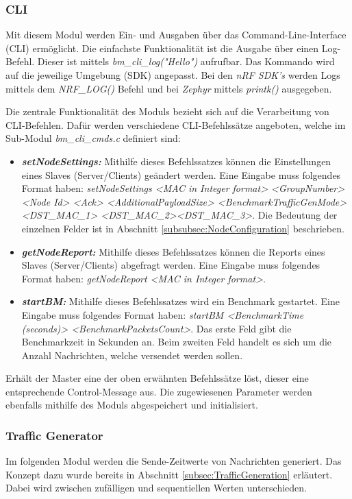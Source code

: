 \subsubsection{CLI}\label{subsubsec:CLI}
Mit diesem Modul werden Ein- und Ausgaben über das Command-Line-Interface (CLI) ermöglicht.
Die einfachste Funktionalität ist die Ausgabe über einen Log-Befehl.
Dieser ist mittels \textit{bm\_cli\_log("Hello")} aufrufbar.
Das Kommando wird auf die jeweilige Umgebung (SDK) angepasst.
Bei den \textit{nRF SDK's} werden Logs mittels dem \textit{NRF\_LOG()} Befehl und bei \textit{Zephyr} mittels \textit{printk()} ausgegeben.

Die zentrale Funktionalität des Moduls bezieht sich auf die Verarbeitung von CLI-Befehlen.
Dafür werden verschiedene CLI-Befehlssätze angeboten, welche im Sub-Modul \textit{bm\_cli\_cmds.c} definiert sind:

\begin{itemize}
	\item \textit{\textbf{setNodeSettings:}} Mithilfe dieses Befehlssatzes können die Einstellungen eines Slaves (Server/Clients) geändert werden. Eine Eingabe muss folgendes Format haben:
	\textit{setNodeSettings <MAC in Integer format> <GroupNumber> <Node Id> <Ack> <AdditionalPayloadSize> <BenchmarkTrafficGenMode> <DST\_MAC\_1>  <DST\_MAC\_2>\linebreak <DST\_MAC\_3>}.
	Die Bedeutung der einzelnen Felder ist in Abschnitt \ref{subsubsec:NodeConfiguration} beschrieben.
	\item \textit{\textbf{getNodeReport:}} Mithilfe dieses Befehlssatzes können die Reports eines Slaves (Server/Clients) abgefragt werden. Eine Eingabe muss folgendes Format haben: 
	\textit{getNodeReport <MAC in Integer format>}.
	\item \textit{\textbf{startBM:}} Mithilfe dieses Befehlssatzes wird ein Benchmark gestartet. Eine Eingabe muss folgendes Format haben:
	\textit{startBM <BenchmarkTime (seconds)> <BenchmarkPackets\linebreak Count>}. Das erste Feld gibt die Benchmarkzeit in Sekunden an. Beim zweiten Feld handelt es sich um die Anzahl Nachrichten, welche versendet werden sollen. 
\end{itemize}

Erhält der Master eine der oben erwähnten Befehlssätze löst, dieser eine entsprechende Control-Message aus.
Die zugewiesenen Parameter werden ebenfalls mithilfe des Moduls abgespeichert und initialisiert. 


\subsubsection{Traffic Generator}\label{subsubsec:TrafficGenerator}
Im folgenden Modul werden die Sende-Zeitwerte von Nachrichten generiert.
Das Konzept dazu wurde bereits in Abschnitt \ref{subsec:TrafficGeneration} erläutert.
Dabei wird zwischen zufälligen und sequentiellen Werten unterschieden.  

